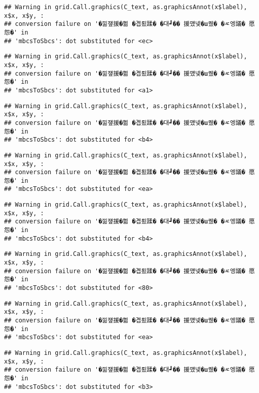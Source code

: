\documentclass[
]{article}
\begin{document}
\begin{verbatim}
## Warning in grid.Call.graphics(C_text, as.graphicsAnnot(x$label), x$x, x$y, :
## conversion failure on '�낆쟾援�쁾 �곕룄蹂� �대┛�� 援먰넻�ш퀬� �ㅼ엥議� 愿怨�' in
## 'mbcsToSbcs': dot substituted for <ec>
\end{verbatim}

\begin{verbatim}
## Warning in grid.Call.graphics(C_text, as.graphicsAnnot(x$label), x$x, x$y, :
## conversion failure on '�낆쟾援�쁾 �곕룄蹂� �대┛�� 援먰넻�ш퀬� �ㅼ엥議� 愿怨�' in
## 'mbcsToSbcs': dot substituted for <a1>
\end{verbatim}

\begin{verbatim}
## Warning in grid.Call.graphics(C_text, as.graphicsAnnot(x$label), x$x, x$y, :
## conversion failure on '�낆쟾援�쁾 �곕룄蹂� �대┛�� 援먰넻�ш퀬� �ㅼ엥議� 愿怨�' in
## 'mbcsToSbcs': dot substituted for <b4>
\end{verbatim}

\begin{verbatim}
## Warning in grid.Call.graphics(C_text, as.graphicsAnnot(x$label), x$x, x$y, :
## conversion failure on '�낆쟾援�쁾 �곕룄蹂� �대┛�� 援먰넻�ш퀬� �ㅼ엥議� 愿怨�' in
## 'mbcsToSbcs': dot substituted for <ea>
\end{verbatim}

\begin{verbatim}
## Warning in grid.Call.graphics(C_text, as.graphicsAnnot(x$label), x$x, x$y, :
## conversion failure on '�낆쟾援�쁾 �곕룄蹂� �대┛�� 援먰넻�ш퀬� �ㅼ엥議� 愿怨�' in
## 'mbcsToSbcs': dot substituted for <b4>
\end{verbatim}

\begin{verbatim}
## Warning in grid.Call.graphics(C_text, as.graphicsAnnot(x$label), x$x, x$y, :
## conversion failure on '�낆쟾援�쁾 �곕룄蹂� �대┛�� 援먰넻�ш퀬� �ㅼ엥議� 愿怨�' in
## 'mbcsToSbcs': dot substituted for <80>
\end{verbatim}

\begin{verbatim}
## Warning in grid.Call.graphics(C_text, as.graphicsAnnot(x$label), x$x, x$y, :
## conversion failure on '�낆쟾援�쁾 �곕룄蹂� �대┛�� 援먰넻�ш퀬� �ㅼ엥議� 愿怨�' in
## 'mbcsToSbcs': dot substituted for <ea>
\end{verbatim}

\begin{verbatim}
## Warning in grid.Call.graphics(C_text, as.graphicsAnnot(x$label), x$x, x$y, :
## conversion failure on '�낆쟾援�쁾 �곕룄蹂� �대┛�� 援먰넻�ш퀬� �ㅼ엥議� 愿怨�' in
## 'mbcsToSbcs': dot substituted for <b3>
\end{verbatim}
\end{document}

